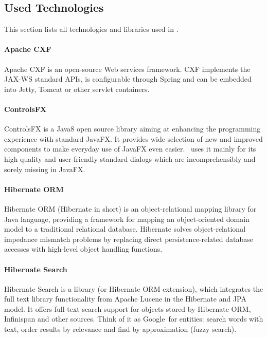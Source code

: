 
\subsection{Used Technologies}

This section lists all technologies and libraries used in \textan.

\paragraph{Apache CXF}
Apache CXF is an open-source Web services framework. CXF implements the JAX-WS 
standard APIs, is configurable through Spring and can be embedded into Jetty,
Tomcat or other servlet containers.

\paragraph{ControlsFX}
ControlsFX is a Java8 open source library aiming at enhancing the programming
experience with standard JavaFX. It provides wide selection of new and improved
components to make everyday use of JavaFX even easier. \textan\ uses it mainly for
its high quality and user-friendly standard dialogs which are incomprehensibly
and sorely missing in JavaFX.

\paragraph{Hibernate ORM}
Hibernate ORM (Hibernate in short) is an object-relational mapping library for
Java language, providing a framework for mapping an object-oriented domain
model to a traditional relational database. Hibernate solves object-relational
impedance mismatch problems by replacing direct persistence-related database
accesses with high-level object handling functions.

\paragraph{Hibernate Search}
Hibernate Search is a library (or Hibernate ORM extension), which integrates
the full text library functionality from Apache Lucene in the Hibernate and
JPA model. It offers full-text search support for objects stored by Hibernate
ORM, Infinispan and other sources. Think of it as Google\texttrademark\ for
entities: search words with text, order results by relevance and find by
approximation (fuzzy search).


